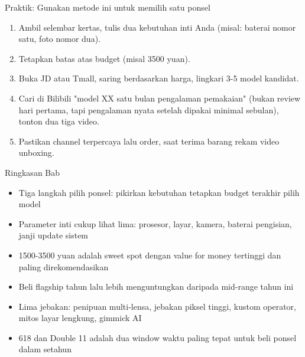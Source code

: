 \begin{tcbpractice}{Praktik: Gunakan metode ini untuk memilih satu ponsel}
\begin{enumerate}
  \item Ambil selembar kertas, tulis dua kebutuhan inti Anda (misal: baterai nomor satu, foto nomor dua).
  \item Tetapkan batas atas budget (misal 3500 yuan).
  \item Buka JD atau Tmall, saring berdasarkan harga, lingkari 3-5 model kandidat.
  \item Cari di Bilibili "model XX satu bulan pengalaman pemakaian" (bukan review hari pertama, tapi pengalaman nyata setelah dipakai minimal sebulan), tonton dua tiga video.
  \item Pastikan channel terpercaya lalu order, saat terima barang rekam video unboxing.
\end{enumerate}

\end{tcbpractice}

\begin{tcbsummary}{Ringkasan Bab}
\begin{itemize}
  \item Tiga langkah pilih ponsel: pikirkan kebutuhan tetapkan budget terakhir pilih model
  \item Parameter inti cukup lihat lima: prosesor, layar, kamera, baterai pengisian, janji update sistem
  \item 1500-3500 yuan adalah sweet spot dengan value for money tertinggi dan paling direkomendasikan
  \item Beli flagship tahun lalu lebih menguntungkan daripada mid-range tahun ini
  \item Lima jebakan: penipuan multi-lensa, jebakan piksel tinggi, kustom operator, mitos layar lengkung, gimmick AI
  \item 618 dan Double 11 adalah dua window waktu paling tepat untuk beli ponsel dalam setahun
\end{itemize}

\end{tcbsummary}
